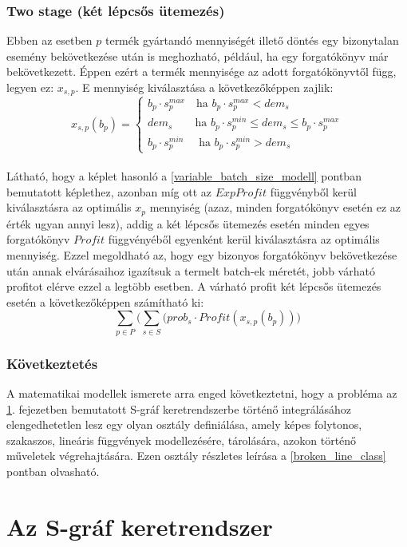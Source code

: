 \documentclass [12pt]{report}
\begin{document}
\subsection{Two stage (két lépcsős ütemezés)}
Ebben az esetben $p$ termék gyártandó mennyiségét illető döntés egy bizonytalan esemény bekövetkezése után is meghozható, például, ha egy forgatókönyv már bekövetkezett. Éppen ezért a termék mennyisége az adott forgatókönyvtől függ, legyen ez: $x_{s,p}$. E mennyiség kiválasztása a következőképpen zajlik:
\begin{equation*}
x_{s,p}(b_p)= \begin{cases}
            b_p \cdot s_p^{max} \quad \text{ha } b_p \cdot s_p^{max}<dem_{s}\\
            dem_{s} \qquad \text{ha } b_p \cdot s_p^{min} \leq dem_{s} \leq b_p \cdot s_p^{max}\\
            b_p \cdot s_p^{min} \quad \text{ ha } b_p \cdot s_p^{min}>dem_{s}
       \end{cases}       
\end{equation*}\\
Látható, hogy a képlet hasonló a \ref{variable_batch_size_modell} pontban bemutatott képlethez, azonban míg ott  az $ExpProfit$ függvényből kerül kiválasztásra az optimális $x_p$ mennyiség (azaz, minden forgatókönyv esetén ez az érték ugyan annyi lesz), addig a két lépcsős ütemezés esetén minden egyes forgatókönyv $Profit$ függvényéből egyenként kerül kiválasztásra az optimális mennyiség. Ezzel megoldható az, hogy egy bizonyos forgatókönyv bekövetkezése után annak elvárásaihoz igazítsuk a termelt batch-ek méretét, jobb várható profitot elérve ezzel a legtöbb esetben. A várható profit két lépcsős ütemezés esetén a következőképpen számítható ki:
$$\sum_{p \in P} \bigg( \sum_{s \in S}(prob_s \cdot Profit(x_{s,p}(b_p)) \bigg)$$ 
\subsection{Következtetés} \label{broken_line_suggestion}
A matematikai modellek ismerete arra enged következtetni, hogy a probléma az \ref{s-graph_framework}. fejezetben bemutatott S-gráf keretrendszerbe történő integrálásához elengedhetetlen lesz egy olyan osztály definiálása, amely képes  folytonos, szakaszos, lineáris függvények modellezésére, tárolására, azokon történő műveletek végrehajtására. Ezen osztály részletes leírása a \ref{broken_line_class} pontban olvasható.
\chapter{Az S-gráf keretrendszer} \label{s-graph_framework}
\end{document}
